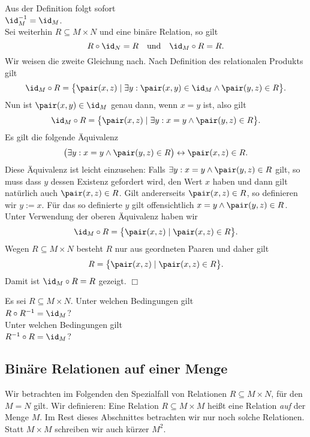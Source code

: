 \noindent
Aus der Definition folgt sofort \\[0.2cm]
\hspace*{1.3cm} $\id_M^{-1} = \id_M$. \\[0.2cm]
Sei weiterhin $R \subseteq M \times N$ und eine binäre Relation, so
gilt 
\[ R \circ \id_N = R \quad \mbox{und} \quad \id_M \circ R = R. \] 
Wir weisen die zweite Gleichung nach.  Nach Definition des relationalen Produkts
gilt
\[ \id_M \circ R = \bigl\{ \pair(x,z) \mid \exists y: \pair(x,y) \in \id_M \wedge \pair(y,z) \in R \bigr\}. \]
Nun ist $\pair(x,y) \in \id_M$ genau dann, wenn $x = y$ ist, also gilt
\[ \id_M \circ R = \bigl\{ \pair(x,z) \mid \exists y: x = y \wedge \pair(y,z) \in R \bigr\}. \]
Es gilt die folgende Äquivalenz
\[ \bigl( \exists y: x = y \wedge \pair(y,z) \in R \bigr) \leftrightarrow \pair(x,z) \in R. \]
Diese Äquivalenz ist leicht einzusehen:  Falls $\exists y: x = y \wedge \pair(y,z) \in R$
gilt, so muss dass $y$ dessen Existenz gefordert wird, den Wert $x$ haben und dann gilt
natürlich auch $\pair(x,z) \in R$.  Gilt andererseits $\pair(x,z) \in R$, so definieren
wir $y := x$.  Für das so definierte $y$ gilt offensichtlich 
$x = y \wedge \pair(y,z) \in R$.  Unter Verwendung der oberen Äquivalenz haben wir 
\[ \id_M \circ R = \bigl\{ \pair(x,z) \mid \pair(x,z) \in R \bigr\}. \]
Wegen  $R \subseteq M \times N$ besteht $R$ nur aus geordneten
Paaren und daher gilt
\[ R = \bigl\{ \pair(x,z) \mid \pair(x,z) \in R \bigr\}. \]
Damit ist $\id_M \circ R = R$ gezeigt. \hspace*{\fill} $\Box$

\exercise
Es sei $R \subseteq M \times N$.  Unter welchen Bedingungen gilt 
\\[0.2cm]
\hspace*{1.3cm}
$R \circ R^{-1} = \id_M$? 
\\[0.2cm]
Unter welchen Bedingungen gilt
\\[0.2cm]
\hspace*{1.3cm}
$R^{-1} \circ R = \id_M$?
\eox



\subsection{Binäre Relationen auf einer Menge}
Wir betrachten im Folgenden den Spezialfall von Relationen $R \subseteq M \times N$, für
den $M = N$ gilt.  Wir definieren:
Eine Relation $R \subseteq M \times M$ heißt eine Relation \emph{auf} der Menge $M$.
Im Rest dieses Abschnittes betrachten wir nur noch solche Relationen. 
Statt $M \times M$ schreiben wir auch kürzer $M^2$.


